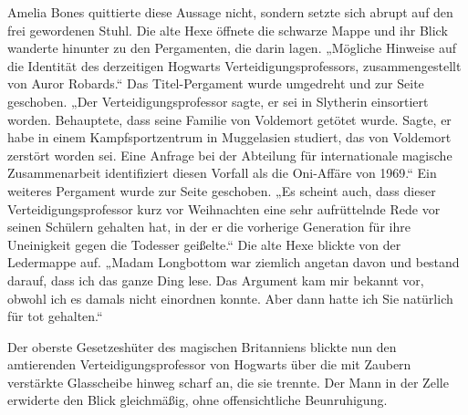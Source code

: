 Amelia Bones quittierte diese Aussage nicht, sondern setzte sich abrupt auf den frei gewordenen Stuhl. Die alte Hexe öffnete die schwarze Mappe und ihr Blick wanderte hinunter zu den Pergamenten, die darin lagen.
„Mögliche Hinweise auf die Identität des derzeitigen Hogwarts Verteidigungsprofessors, zusammengestellt von Auror Robards.“
Das Titel-Pergament wurde umgedreht und zur Seite geschoben. „Der Verteidigungsprofessor sagte, er sei in Slytherin einsortiert worden. Behauptete, dass seine Familie von Voldemort getötet wurde. Sagte, er habe in einem Kampfsportzentrum in Muggelasien studiert, das von Voldemort zerstört worden sei. Eine Anfrage bei der Abteilung für internationale magische Zusammenarbeit identifiziert diesen Vorfall als die Oni-Affäre von 1969.“
Ein weiteres Pergament wurde zur Seite geschoben. „Es scheint auch, dass dieser Verteidigungsprofessor kurz vor Weihnachten eine sehr aufrüttelnde Rede vor seinen Schülern gehalten hat, in der er die vorherige Generation für ihre Uneinigkeit gegen die Todesser geißelte.“
Die alte Hexe blickte von der Ledermappe auf.
„Madam Longbottom war ziemlich angetan davon und bestand darauf, dass ich das ganze Ding lese. Das Argument kam mir bekannt vor, obwohl ich es damals nicht einordnen konnte. Aber dann hatte ich Sie natürlich für tot gehalten.“

Der oberste Gesetzeshüter des magischen Britanniens blickte nun den amtierenden Verteidigungsprofessor von Hogwarts über die mit Zaubern verstärkte Glasscheibe hinweg scharf an, die sie trennte. Der Mann in der Zelle erwiderte den Blick gleichmäßig, ohne offensichtliche Beunruhigung.

